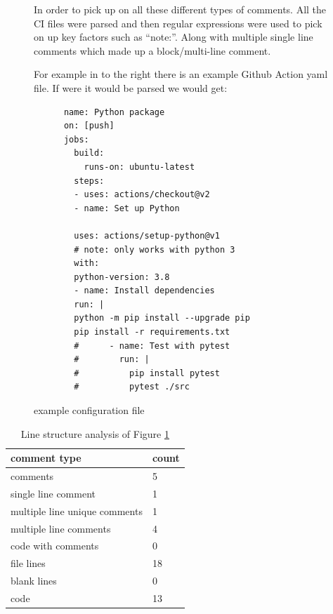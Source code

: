 \documentclass[twoside,12pt,titlepage,a4paper]{article}
\begin{document}
\begin{figure}[!htbp]
  \centering
  \begin{minipage}[t]{.48\textwidth}
    In order to pick up on all these different types of comments. All the CI files were parsed and then regular expressions were used to pick on up key factors such as \enquote{note:}. Along with multiple single line comments which made up a block/multi-line comment.
    
    For example in to the right there is an example Github Action yaml file. If were it would be parsed we would get: 
  \end{minipage}%
  \hfill
  \begin{minipage}[t]{.48\textwidth}
    \begin{verbatim}
      name: Python package
      on: [push]
      jobs:
        build:
          runs-on: ubuntu-latest
        steps:
        - uses: actions/checkout@v2
        - name: Set up Python
        
        uses: actions/setup-python@v1
        # note: only works with python 3
        with:
        python-version: 3.8
        - name: Install dependencies
        run: |
        python -m pip install --upgrade pip
        pip install -r requirements.txt
        #      - name: Test with pytest
        #        run: |
        #          pip install pytest
        #          pytest ./src
    \end{verbatim}
    \caption{example configuration file}
    \label{fig:example_configuration_file}
  \end{minipage}
\end{figure}


\begin{table}
  \begin{tabular}{|l|l|}
    \hline
    \textbf{comment type} & \textbf{count} \\ \hline
    comments & 5 \\ \hline
    single line comment & 1 \\ \hline
    multiple line unique comments & 1 \\ \hline
    multiple line comments  & 4 \\ \hline
    code with comments & 0 \\ \hline
    file lines & 18 \\ \hline
    blank lines & 0 \\ \hline
    code & 13 \\ \hline
  \end{tabular}
  \caption{Line structure analysis of Figure \ref{fig:example_configuration_file}}
  \label{table:example_structure_data}
\end{table}
\end{document}
